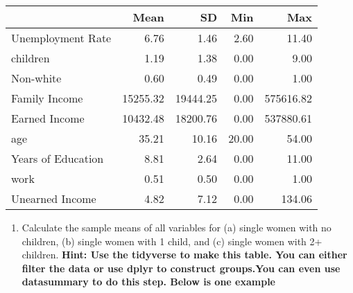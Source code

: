 \documentclass[
]{article}
\providecommand{\tightlist}{%
  \setlength{\itemsep}{0pt}\setlength{\parskip}{0pt}}
\begin{document}
\begin{table}
\centering
\begin{tabular}[t]{lrrrr}
\toprule
  & Mean & SD & Min & Max\\
\midrule
Unemployment Rate & \num{6.76} & \num{1.46} & \num{2.60} & \num{11.40}\\
children & \num{1.19} & \num{1.38} & \num{0.00} & \num{9.00}\\
Non-white & \num{0.60} & \num{0.49} & \num{0.00} & \num{1.00}\\
Family Income & \num{15255.32} & \num{19444.25} & \num{0.00} & \num{575616.82}\\
Earned Income & \num{10432.48} & \num{18200.76} & \num{0.00} & \num{537880.61}\\
age & \num{35.21} & \num{10.16} & \num{20.00} & \num{54.00}\\
Years of Education & \num{8.81} & \num{2.64} & \num{0.00} & \num{11.00}\\
work & \num{0.51} & \num{0.50} & \num{0.00} & \num{1.00}\\
Unearned Income & \num{4.82} & \num{7.12} & \num{0.00} & \num{134.06}\\
\bottomrule
\end{tabular}
\end{table}

\begin{enumerate}
\def\labelenumi{\arabic{enumi}.}
\setcounter{enumi}{1}
\tightlist
\item
  Calculate the sample means of all variables for (a) single women with
  no children, (b) single women with 1 child, and (c) single women with
  2+ children. \textbf{Hint: Use the tidyverse to make this table. You
  can either filter the data or use dplyr to construct groups.You can
  even use datasummary to do this step. Below is one example}
\end{enumerate}
\end{document}
